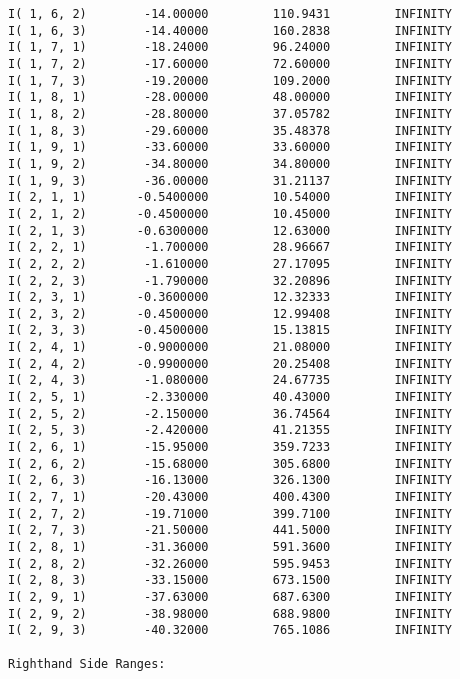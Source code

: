 \documentclass[12pt]{article}
\begin{document}
\begin{appendices}
\begin{lstlisting}
I( 1, 6, 2)        -14.00000         110.9431         INFINITY
I( 1, 6, 3)        -14.40000         160.2838         INFINITY
I( 1, 7, 1)        -18.24000         96.24000         INFINITY
I( 1, 7, 2)        -17.60000         72.60000         INFINITY
I( 1, 7, 3)        -19.20000         109.2000         INFINITY
I( 1, 8, 1)        -28.00000         48.00000         INFINITY
I( 1, 8, 2)        -28.80000         37.05782         INFINITY
I( 1, 8, 3)        -29.60000         35.48378         INFINITY
I( 1, 9, 1)        -33.60000         33.60000         INFINITY
I( 1, 9, 2)        -34.80000         34.80000         INFINITY
I( 1, 9, 3)        -36.00000         31.21137         INFINITY
I( 2, 1, 1)       -0.5400000         10.54000         INFINITY
I( 2, 1, 2)       -0.4500000         10.45000         INFINITY
I( 2, 1, 3)       -0.6300000         12.63000         INFINITY
I( 2, 2, 1)        -1.700000         28.96667         INFINITY
I( 2, 2, 2)        -1.610000         27.17095         INFINITY
I( 2, 2, 3)        -1.790000         32.20896         INFINITY
I( 2, 3, 1)       -0.3600000         12.32333         INFINITY
I( 2, 3, 2)       -0.4500000         12.99408         INFINITY
I( 2, 3, 3)       -0.4500000         15.13815         INFINITY
I( 2, 4, 1)       -0.9000000         21.08000         INFINITY
I( 2, 4, 2)       -0.9900000         20.25408         INFINITY
I( 2, 4, 3)        -1.080000         24.67735         INFINITY
I( 2, 5, 1)        -2.330000         40.43000         INFINITY
I( 2, 5, 2)        -2.150000         36.74564         INFINITY
I( 2, 5, 3)        -2.420000         41.21355         INFINITY
I( 2, 6, 1)        -15.95000         359.7233         INFINITY
I( 2, 6, 2)        -15.68000         305.6800         INFINITY
I( 2, 6, 3)        -16.13000         326.1300         INFINITY
I( 2, 7, 1)        -20.43000         400.4300         INFINITY
I( 2, 7, 2)        -19.71000         399.7100         INFINITY
I( 2, 7, 3)        -21.50000         441.5000         INFINITY
I( 2, 8, 1)        -31.36000         591.3600         INFINITY
I( 2, 8, 2)        -32.26000         595.9453         INFINITY
I( 2, 8, 3)        -33.15000         673.1500         INFINITY
I( 2, 9, 1)        -37.63000         687.6300         INFINITY
I( 2, 9, 2)        -38.98000         688.9800         INFINITY
I( 2, 9, 3)        -40.32000         765.1086         INFINITY

Righthand Side Ranges:


\end{lstlisting}
\end{appendices}
\end{document}
